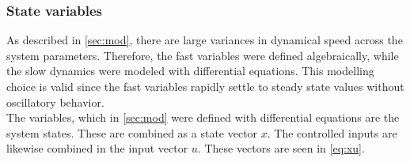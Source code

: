 \newpage

\subsubsection{State variables}

As described in \cref{sec:mod}, there are large variances in dynamical speed across the system parameters. Therefore, the fast variables were defined algebraically, while the slow dynamics were modeled with differential equations. This modelling choice is valid since the fast variables rapidly settle to steady state values without oscillatory behavior. \\


The variables, which in \cref{sec:mod} were defined with differential equations are the system states. These are combined as a state vector $x$. The controlled inputs are likewise combined in the input vector $u$. These vectors are seen in \cref{eq:xu}.
